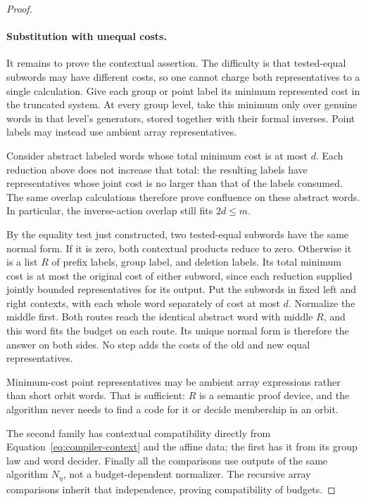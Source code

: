 \begin{proof}
\paragraph{Substitution with unequal costs.}
It remains to prove the contextual assertion.  The difficulty is
that tested-equal subwords may have different costs, so one cannot
charge both representatives to a single calculation.
Give each group or point label its minimum represented cost in the
truncated system.  At every group level, take this minimum only over
genuine words in that level's generators, stored together with their
formal inverses.  Point labels may instead use ambient array
representatives.

Consider abstract labeled words whose total minimum cost is at most
$d$.  Each reduction above does not increase that total: the resulting
labels have representatives whose joint cost is no larger than that
of the labels consumed.  The same overlap calculations therefore
prove confluence on these abstract words.  In particular, the
inverse-action overlap still fits $2d\leq m$.

By the equality test just constructed, two tested-equal subwords
have the same normal form.  If it is zero, both contextual products
reduce to zero.  Otherwise it is a list $R$ of prefix labels, group
label, and deletion labels.  Its total minimum
cost is at most the original cost of either subword, since each
reduction supplied jointly bounded representatives for its output.
Put the subwords in fixed left and right contexts, with each whole
word separately of cost at most $d$.  Normalize the middle first.
Both routes reach the identical abstract word with middle $R$, and
this word fits the budget on each route.  Its unique normal form is
therefore the answer on both sides.  No step adds the costs of the
old and new equal representatives.

Minimum-cost point representatives may be ambient
array expressions rather than short orbit words.
That is sufficient: $R$ is a semantic proof device,
and the algorithm never needs to find a code for
it or decide membership in an orbit.

The second family has contextual compatibility
directly from Equation~\eqref{eq:compiler-context}
and the affine data; the first has it from its
group law and word decider.  Finally all the
comparisons use outputs of the same algorithm
$N_\eta$, not a budget-dependent normalizer.
The recursive array comparisons inherit that
independence, proving compatibility of budgets.
\end{proof}

